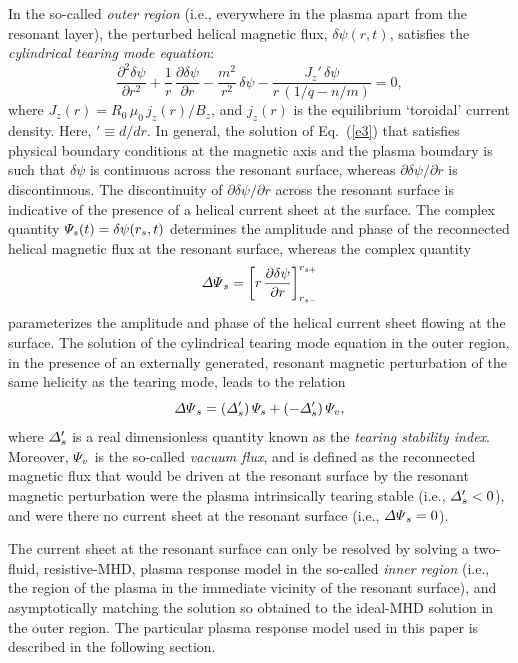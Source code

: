 \documentclass[12pt,prb,aps]{revtex4-1}
\begin{document}
In the so-called {\em outer region}\/ (i.e., everywhere in the plasma
apart from the resonant layer), the perturbed helical magnetic flux, $\delta\psi(r,t)$, satisfies the
{\em cylindrical tearing mode equation}:\cite{wes}
\begin{equation}\label{e3}
\frac{\partial^2\delta\psi}{\partial r^2} + \frac{1}{r}\,\frac{\partial\delta\psi}{\partial r}-\frac{m^2}{r^2}\,\delta\psi - \frac{J_z'\,\delta\psi}{r\,(1/q-n/m)}=  0,
\end{equation}
where 
$J_z(r)= R_0\,\mu_0\,j_z(r)/B_z$,
and $j_z(r)$ is the equilibrium `toroidal' current density. Here, $'\equiv d/dr$. In general, the solution of Eq.~(\ref{e3}) that satisfies physical
boundary conditions at the magnetic axis and the plasma boundary is such that $\delta\psi$ is continuous
across the resonant surface, whereas $\partial\delta\psi/\partial r$ is discontinuous. The discontinuity of
 $\partial\delta\psi/\partial r$ across the resonant surface is indicative of the presence of a helical current
 sheet at the surface.  The complex quantity ${\mit\Psi}_s(t)= \delta\psi(r_s,t)$ determines the amplitude
 and phase of the reconnected helical magnetic flux at the resonant surface, whereas the complex quantity\,\cite{rf1993}
 \begin{equation}
{\mit\Delta\Psi}_s = \left[r\,\frac{\partial \delta\psi}{\partial r}\right]_{r_{s-}}^{r_{s+}}
\end{equation}
parameterizes the amplitude and phase of the helical current sheet flowing at the surface. The solution of
the cylindrical tearing mode equation in the outer region, in the presence of an externally generated, resonant magnetic perturbation 
of the same helicity as the tearing mode, leads to the relation\,\cite{rf1993,fkr}
\begin{equation}\label{e110}
{\mit\Delta\Psi}_s= ({\mit\Delta}_s')\,{\mit\Psi}_s + (-{\mit\Delta}_s')\,{\mit\Psi}_v,
\end{equation}
where ${\mit\Delta}_s'$ is a real dimensionless quantity known as the {\em tearing stability index}. Moreover,
${\mit\Psi}_v$ is the so-called {\em vacuum flux}, and is defined as the reconnected magnetic flux
that would be driven at the resonant surface by the resonant magnetic perturbation were the
plasma intrinsically tearing stable (i.e., ${\mit\Delta}_s' <0$), and were there no current sheet at the resonant surface
(i.e., ${\mit\Delta\Psi}_s=0$).

The current sheet at the resonant surface can only be resolved by solving  a two-fluid, resistive-MHD, plasma response model
in the so-called {\em inner region}\/ (i.e., the region of the plasma in the immediate vicinity of the resonant surface), 
and asymptotically matching the solution so obtained to the ideal-MHD solution in the outer region. The particular 
plasma response model used in this paper is
described in the following section. 
\end{document}
